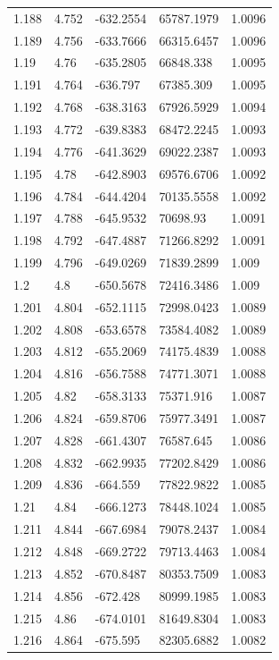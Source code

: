 \begin{tabular}{lllll}
1.188 & 4.752 & -632.2554 & 65787.1979 & 1.0096 \\
1.189 & 4.756 & -633.7666 & 66315.6457 & 1.0096 \\
1.19 & 4.76 & -635.2805 & 66848.338 & 1.0095 \\
1.191 & 4.764 & -636.797 & 67385.309 & 1.0095 \\
1.192 & 4.768 & -638.3163 & 67926.5929 & 1.0094 \\
1.193 & 4.772 & -639.8383 & 68472.2245 & 1.0093 \\
1.194 & 4.776 & -641.3629 & 69022.2387 & 1.0093 \\
1.195 & 4.78 & -642.8903 & 69576.6706 & 1.0092 \\
1.196 & 4.784 & -644.4204 & 70135.5558 & 1.0092 \\
1.197 & 4.788 & -645.9532 & 70698.93 & 1.0091 \\
1.198 & 4.792 & -647.4887 & 71266.8292 & 1.0091 \\
1.199 & 4.796 & -649.0269 & 71839.2899 & 1.009 \\
1.2 & 4.8 & -650.5678 & 72416.3486 & 1.009 \\
1.201 & 4.804 & -652.1115 & 72998.0423 & 1.0089 \\
1.202 & 4.808 & -653.6578 & 73584.4082 & 1.0089 \\
1.203 & 4.812 & -655.2069 & 74175.4839 & 1.0088 \\
1.204 & 4.816 & -656.7588 & 74771.3071 & 1.0088 \\
1.205 & 4.82 & -658.3133 & 75371.916 & 1.0087 \\
1.206 & 4.824 & -659.8706 & 75977.3491 & 1.0087 \\
1.207 & 4.828 & -661.4307 & 76587.645 & 1.0086 \\
1.208 & 4.832 & -662.9935 & 77202.8429 & 1.0086 \\
1.209 & 4.836 & -664.559 & 77822.9822 & 1.0085 \\
1.21 & 4.84 & -666.1273 & 78448.1024 & 1.0085 \\
1.211 & 4.844 & -667.6984 & 79078.2437 & 1.0084 \\
1.212 & 4.848 & -669.2722 & 79713.4463 & 1.0084 \\
1.213 & 4.852 & -670.8487 & 80353.7509 & 1.0083 \\
1.214 & 4.856 & -672.428 & 80999.1985 & 1.0083 \\
1.215 & 4.86 & -674.0101 & 81649.8304 & 1.0083 \\
1.216 & 4.864 & -675.595 & 82305.6882 & 1.0082 \\

\end{tabular}
